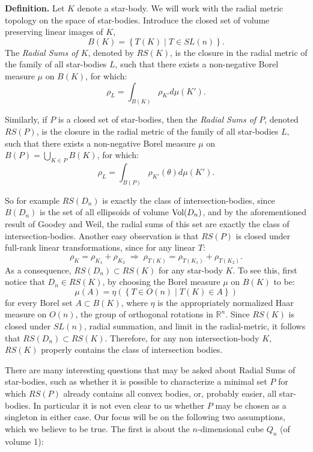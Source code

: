 \documentclass[12pt,oneside]{amsart}
\theoremstyle{definition}
\theoremstyle{remark}
\theoremstyle{proof}
\numberwithin{equation}{section}
\newcommand{\set}[1]{\left\{#1\right\}}
\newcommand{\Real}{\mathbb{R}}
\newcommand{\Vol}[1]{\textnormal{Vol} (#1)}
\newcommand{\definition}[1]{\medskip\noindent\textbf{Definition.}#1\medskip}
\begin{document}
\definition{
Let $K$ denote a star-body. We will work with the radial metric
topology on the space of star-bodies. Introduce the closed set of
volume preserving linear images of $K$,
\[B(K) = \set{T(K) \; | \; T \in SL(n)}.\]
The \emph{Radial Sums of $K$}, denoted by $RS(K)$, is the
closure in the radial metric of the
family of all star-bodies $L$, such that there exists a
non-negative Borel measure $\mu$ on $B(K)$, for which:
\[
\rho_L = \int_{B(K)} \rho_{K'} d\mu(K').
\]

\noindent Similarly, if $P$ is a closed set of star-bodies, then
the \emph{Radial Sums of $P$}, denoted $RS(P)$, is the
closure in the radial metric of the
family of all star-bodies $L$, such that there exists a
non-negative Borel measure $\mu$ on $B(P) = \bigcup_{K \in P}
B(K)$, for which:
\[
\rho_L = \int_{B(P)} \rho_{K'}(\theta) d\mu(K').
\]
}

So for example $RS(D_n)$ is exactly the class of
intersection-bodies, since $B(D_n)$ is the set of all ellipsoids
of volume $\Vol{D_n}$, and by the aforementioned result of Goodey
and Weil, the radial sums of this set are exactly the class of
intersection-bodies. Another easy observation is that $RS(P)$ is
closed under full-rank linear transformations, since for any
linear $T$:
\[
\rho_K = \rho_{K_1} + \rho_{K_2} \; \Rightarrow \; \rho_{T(K)} =
\rho_{T(K_1)} + \rho_{T(K_2)}.
\]
As a consequence, $RS(D_n) \subset RS(K)$ for any star-body $K$.
To see this, first notice that $D_n \in RS(K)$, by choosing the
Borel measure $\mu$ on $B(K)$ to be:
\[
\mu(A) = \eta(\set{T \in O(n) \; | \; T(K) \in A})
\]
for every Borel set $A \subset B(K)$, where $\eta$ is the
appropriately normalized Haar measure on $O(n)$, the group of
orthogonal rotations in $\Real^n$. Since $RS(K)$ is closed under
$SL(n)$, radial summation, and limit in the radial-metric, it
follows that $RS(D_n) \subset RS(K)$. Therefore, for any non
intersection-body $K$, $RS(K)$ properly contains the class of
intersection bodies.

There are many interesting questions that may be asked about
Radial Sums of star-bodies, such as whether it is possible to
characterize a minimal set $P$ for which $RS(P)$ already contains
all convex bodies, or, probably easier, all star-bodies. In
particular it is not even clear to us whether $P$ may be chosen
as a singleton in either case. Our focus will be on the following
two assumptions, which we believe to be true. The first is about
the $n$-dimensional cube $Q_n$ (of volume 1):
\end{document}
